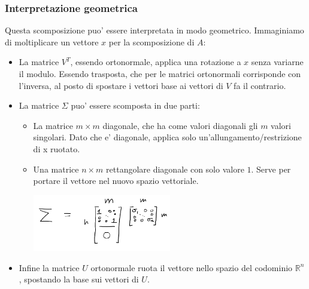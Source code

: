 \subsubsection{Interpretazione geometrica}
Questa scomposizione puo' essere interpretata in modo geometrico. Immaginiamo di moltiplicare un vettore $ x $ per la scomposizione di $ A $:
\begin{itemize}
  \item La matrice $ V^T $, essendo ortonormale, applica una rotazione a $ x $ senza variarne il modulo. Essendo trasposta, che per le matrici ortonormali corrisponde con l'inversa, al posto di spostare i vettori base ai vettori di $ V $ fa il contrario.
  \item La matrice $ \Sigma $ puo' essere scomposta in due parti:
    \begin{itemize}
      \item La matrice $ m \times m $ diagonale, che ha come valori diagonali gli $ m $ valori singolari. Dato che e' diagonale, applica solo un'allungamento/restrizione di x ruotato.
      \item Una matrice $ n \times m $ rettangolare diagonale con solo valore $ 1 $. Serve per portare il vettore nel nuovo spazio vettoriale. 
      \begin{center}
        \includegraphics[width=0.5\textwidth]{img/2024-11-20-17-27-02.png}
      \end{center}
    \end{itemize}
  \item Infine la matrice $ U $ ortonormale ruota il vettore nello spazio del codominio $ \mathbb{R}^n $, spostando la base sui vettori di $ U $.
\end{itemize}

